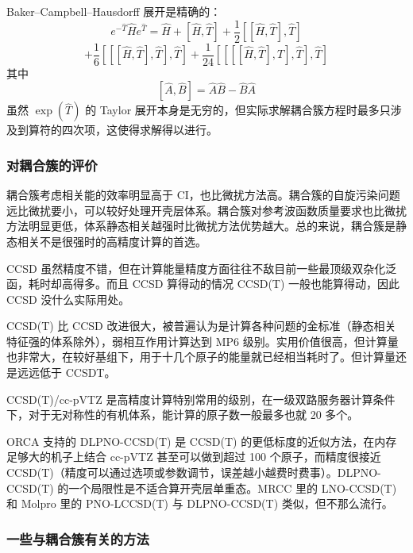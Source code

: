 Baker--Campbell--Hausdorff 展开是精确的：
\[
e^{-\hat T}\hat H e^{\hat T}
=
\hat H+[\hat H,\hat T]+\frac{1}{2}[[\hat H,\hat T],\hat T]
\]
\[
+
\frac{1}{6}[[[\hat H,\hat T],\hat T],\hat T]
+
\frac{1}{24}[[[[\hat H,\hat T],\hat T],\hat T],\hat T]
\]
其中
\[
[\hat A,\hat B]=\hat A\hat B-\hat B\hat A
\]
虽然 $\exp(\hat T)$ 的 Taylor 展开本身是无穷的，但实际求解耦合簇方程时最多只涉及到算符的四次项，这使得求解得以进行。

\subsubsection*{对耦合簇的评价}

耦合簇考虑相关能的效率明显高于 CI，也比微扰方法高。耦合簇的自旋污染问题远比微扰要小，可以较好处理开壳层体系。耦合簇对参考波函数质量要求也比微扰方法明显更低，体系静态相关越强时比微扰方法优势越大。总的来说，耦合簇是静态相关不是很强时的高精度计算的首选。

CCSD 虽然精度不错，但在计算能量精度方面往往不敌目前一些最顶级双杂化泛函，耗时却高得多。而且 CCSD 算得动的情况 CCSD(T) 一般也能算得动，因此 CCSD 没什么实际用处。

CCSD(T) 比 CCSD 改进很大，被普遍认为是计算各种问题的金标准（静态相关特征强的体系除外），弱相互作用计算达到 MP6 级别。实用价值很高，但计算量也非常大，在较好基组下，用于十几个原子的能量就已经相当耗时了。但计算量还是远远低于 CCSDT。

CCSD(T)/cc-pVTZ 是高精度计算特别常用的级别，在一级双路服务器计算条件下，对于无对称性的有机体系，能计算的原子数一般最多也就 20 多个。

ORCA 支持的 DLPNO-CCSD(T) 是 CCSD(T) 的更低标度的近似方法，在内存足够大的机子上结合 cc-pVTZ 甚至可以做到超过 100 个原子，而精度很接近 CCSD(T)（精度可以通过选项或参数调节，误差越小越费时费事）。DLPNO-CCSD(T) 的一个局限性是不适合算开壳层单重态。MRCC 里的 LNO-CCSD(T) 和 Molpro 里的 PNO-LCCSD(T) 与 DLPNO-CCSD(T) 类似，但不那么流行。

\subsubsection*{一些与耦合簇有关的方法}

